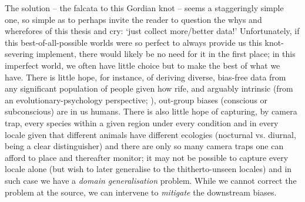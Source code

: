%
The solution -- the falcata to this Gordian knot -- seems a staggeringly simple one, so simple as to
perhaps invite the reader to question the whys and wherefores of this thesis and cry: `just collect
more/better data!'
%
Unfortunately, if this best-of-all-possible worlds were so perfect to always provide us this
knot-severing implement, there would likely be no need for it in the first place; in this imperfect
world, we often have little choice but to make the best of what we have. 
%
There is little hope, for instance, of deriving diverse, bias-free data from any significant
population of people given how rife, and arguably intrinsic (from an evolutionary-psychology
perspective; \cite{kurzban2001evolutionary}), out-group biases (conscious or subconscious) are in
us humans.
%
There is also little hope of capturing, by camera trap, every species within a given region under
every condition and in every locale given that different animals have different ecologies
(nocturnal vs. diurnal, being a clear distinguisher) and there are only so many camera traps one
can afford to place and thereafter monitor; it may not be possible to capture every locale alone
(but wish to later generalise to the thitherto-unseen locales) and in such case we have a
\emph{domain generalisation} problem.
%
While we cannot correct the problem at the source, we can intervene to \emph{mitigate} the
downstream biases.





%
%



%
